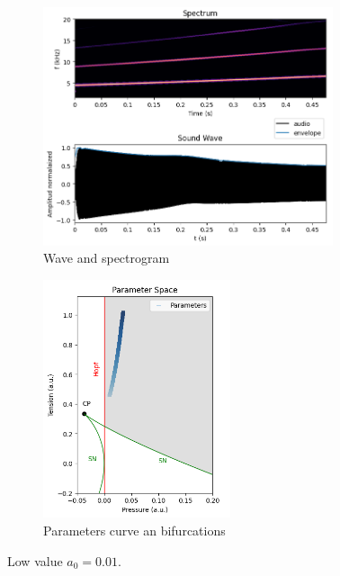 \begin{figure}[H]
     \centering
     \begin{subfigure}[b]{0.48\textwidth}
         \centering
         \includegraphics[width=\textwidth, height=7cm]{Images/a001_wave.png}
         \caption{Wave and spectrogram}
         \label{fig:wavea001}
     \end{subfigure}
     \hfill
     \begin{subfigure}[b]{0.48\textwidth}
         \centering
         \includegraphics[width=\textwidth, height=7cm]{Images/a001_param.png}
         \caption{Parameters curve an bifurcations}
         \label{fig:parama001}
     \end{subfigure}
     \hfill
        \caption{Low value $a_0=0.01$.}
        \label{fig:a001}
\end{figure}

